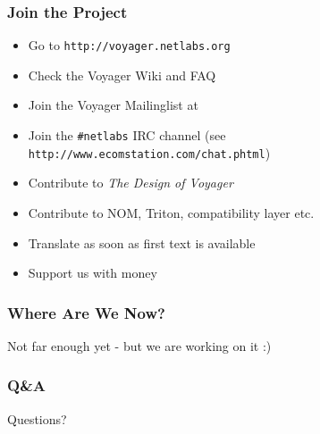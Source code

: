 \documentclass{beamer}
\begin{document}
\begin{frame}
\frametitle{Join the Project}
\begin{itemize}[<+->]
  \item Go to \texttt{http://voyager.netlabs.org}
  \item Check the Voyager Wiki and FAQ
  \item Join the Voyager Mailinglist at
  \item Join the \texttt{\#netlabs} IRC channel (see
  \texttt{http://www.ecomstation.com/chat.phtml})
  \item Contribute to \textit{The Design of Voyager}
  \item Contribute to NOM, Triton, compatibility layer etc.
  \item Translate as soon as first text is available
  \item Support us with money
\end{itemize}
\end{frame}

\begin{frame}
\frametitle{Where Are We Now?}
	Not far enough yet - but we are working on it :)
\end{frame}

\begin{frame}
\frametitle{Q\&A}
	Questions?
\end{frame}
\end{document}
